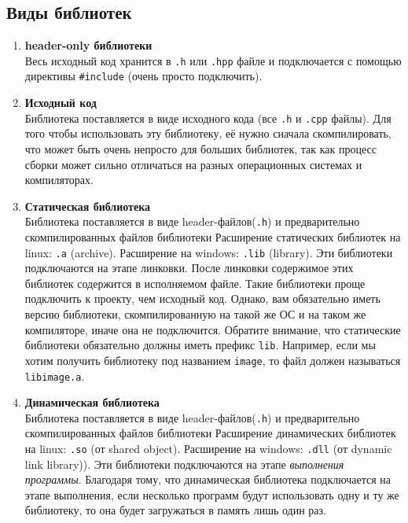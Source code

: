 \documentclass{article}
\begin{document}
\subsection*{Виды библиотек}
\begin{enumerate}
\item \textbf{header-only библиотеки} \\
Весь исходный код хранится в \texttt{.h} или \texttt{.hpp} файле и подключается с помощью директивы \texttt{\#include} (очень просто подключить).

\item \textbf{Исходный код} \\
Библиотека поставляется в виде исходного кода (все \texttt{.h} и \texttt{.cpp} файлы). Для того чтобы использовать эту библиотеку, её нужно сначала скомпилировать, что может быть очень непросто для больших библиотек, так как процесс сборки может сильно отличаться на разных операционных системах и компиляторах.

\item \textbf{Статическая библиотека} \\
Библиотека поставляется в виде header-файлов(\texttt{.h}) и предварительно скомпилированных файлов библиотеки Расширение статических библиотек на linux: \texttt{.a} (archive). Расширение на windows: \texttt{.lib} (library). Эти библиотеки подключаются на этапе линковки. После линковки содержимое этих библиотек содержится в исполняемом файле. Такие библиотеки проще подключить к проекту, чем исходный код. Однако, вам обязательно иметь версию библиотеки, скомпилированную на такой же ОС и на таком же компиляторе, иначе она не подключится. Обратите внимание, что статические библиотеки обязательно должны иметь префикс \texttt{lib}. Например, если мы хотим получить библиотеку под названием \texttt{image}, то файл должен называться \texttt{libimage.a}.

\item \textbf{Динамическая библиотека} \\
Библиотека поставляется в виде header-файлов(\texttt{.h}) и предварительно скомпилированных файлов библиотеки Расширение динамических библиотек на linux: \texttt{.so} (от shared object). Расширение на windows: \texttt{.dll} (от dynamic link library)). Эти библиотеки подключаются на этапе \textit{выполнения программы}. Благодаря тому, что динамическая библиотека подключается на этапе выполнения, если несколько программ будут использовать одну и ту же библиотеку, то она будет загружаться в память лишь один раз.
\end{enumerate}
\end{document}
